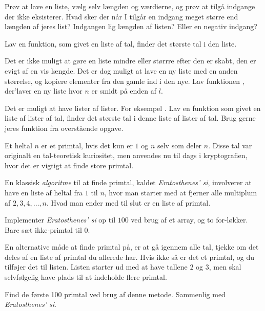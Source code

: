 	\begin{exercise}
        Prøv at lave en liste, vælg selv længden og værdierne, og prøv
        at tilgå indgange der ikke eksisterer. Hvad sker der når I
        tilgår en indgang meget større end længden af jeres list?
        Indgangen lig længden af listen? Eller en negativ indgang?
	\end{exercise}

	\begin{exercise}
		Lav en funktion, som givet en liste af tal, finder det største tal i den
		liste.
	\end{exercise}

    \begin{exercise}
        Det er ikke muligt at gøre en liste mindre eller størrre efter
        den er skabt, den er evigt af en vis længde.  Det er dog
        muligt at lave en ny liste med en anden størrelse, og kopiere
        elementer fra den gamle ind i den nye.
        Lav funktionen ,
        der'laver en ny liste hvor \(n\) er smidt på enden af \(l\).
    \end{exercise}

    \begin{exercise}
        Det er muligt at have lister af lister. For eksempel
        .  Lav en funktion som givet en liste af
        lister af tal, finder det største tal i denne liste af lister
        af tal. Brug gerne jeres funktion fra overstående opgave.
    \end{exercise}

	\begin{exercise}
        Et heltal \(n\) er et primtal, hvis det kun er \(1\) og \(n\)
        selv som deler \(n\). Disse tal var originalt en tal-teoretisk
        kuriositet, men anvendes nu til dags i kryptografien, hvor det
        er vigtigt at finde store primtal.

        En klassisk \emph{algoritme} til at finde primtal, kaldet
        \emph{Eratosthenes' si}, involverer at have en liste af heltal
        fra \(1\) til \(n\), hvor man starter med at fjerner alle
        multiplum af \(2, 3, 4, \dots, n\). Hvad man ender med til
        slut er en liste af primtal.

        Implementer \emph{Eratosthenes' si} op til \(100\) ved brug af
        et array, og to for-løkker. Bare sæt ikke-primtal til \(0\).
	\end{exercise}

    \begin{exercise}
        En alternative måde at finde primtal på, er at gå igennem alle
        tal, tjekke om det deles af en liste af primtal du allerede
        har. Hvis ikke så er det et primtal, og du tilføjer det til
        listen. Listen starter ud med at have tallene \(2\) og \(3\),
        men skal selvfølgelig have plads til at indeholde flere
        primtal.

        Find de første 100 primtal ved brug af denne metode. Sammenlig
        med \emph{Eratosthenes' si}.
    \end{exercise}

